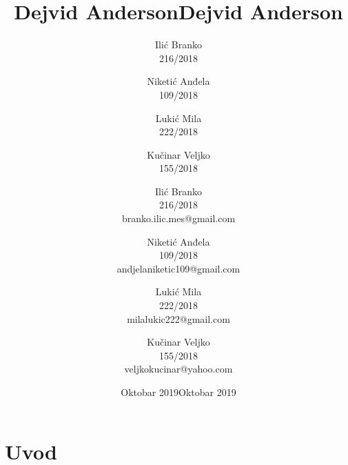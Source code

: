\documentclass[titlepage, 12pt]{article}
\title{Dejvid Anderson}
\author{Ilić Branko \\ 216/2018 \and  Niketić Anđela \\ 109/2018 \and Lukić Mila \\ 222/2018 \and Kučinar Veljko \\ 155/2018 }
\date{Oktobar 2019}
\begin{document}
\title{Dejvid Anderson}
\author{Ilić Branko \\ 216/2018 \\branko.ilic.mes@gmail.com \and  Niketić Anđela \\ 109/2018 \\ andjelaniketic109@gmail.com \and Lukić Mila \\ 222/2018 \\milalukic222@gmail.com \and Kučinar Veljko \\ 155/2018 \\ veljkokucinar@yahoo.com }
\date{Oktobar 2019}

\maketitle
\section{Uvod}
\end{document}
